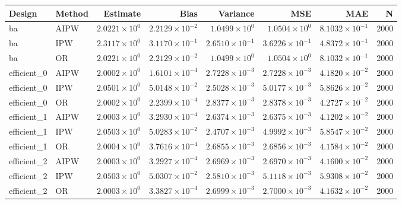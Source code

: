 \begin{table}[ht]
\centering
\begin{tabular}{llrrrrrr}
  \toprule
Design & Method & Estimate & Bias & Variance & MSE & MAE & N \\ 
  \midrule
ba & AIPW & $2.0221 \times 10^{0}$ & $2.2129 \times 10^{-2}$ & $1.0499 \times 10^{0}$ & $1.0504 \times 10^{0}$ & $8.1032 \times 10^{-1}$ & 2000 \\ 
  ba & IPW & $2.3117 \times 10^{0}$ & $3.1170 \times 10^{-1}$ & $2.6510 \times 10^{-1}$ & $3.6226 \times 10^{-1}$ & $4.8372 \times 10^{-1}$ & 2000 \\ 
  ba & OR & $2.0221 \times 10^{0}$ & $2.2129 \times 10^{-2}$ & $1.0499 \times 10^{0}$ & $1.0504 \times 10^{0}$ & $8.1032 \times 10^{-1}$ & 2000 \\ 
   \midrule
efficient\_0 & AIPW & $2.0002 \times 10^{0}$ & $1.6101 \times 10^{-4}$ & $2.7228 \times 10^{-3}$ & $2.7228 \times 10^{-3}$ & $4.1820 \times 10^{-2}$ & 2000 \\ 
  efficient\_0 & IPW & $2.0501 \times 10^{0}$ & $5.0148 \times 10^{-2}$ & $2.5028 \times 10^{-3}$ & $5.0177 \times 10^{-3}$ & $5.8626 \times 10^{-2}$ & 2000 \\ 
  efficient\_0 & OR & $2.0002 \times 10^{0}$ & $2.2399 \times 10^{-4}$ & $2.8377 \times 10^{-3}$ & $2.8378 \times 10^{-3}$ & $4.2727 \times 10^{-2}$ & 2000 \\ 
   \midrule
efficient\_1 & AIPW & $2.0003 \times 10^{0}$ & $3.2930 \times 10^{-4}$ & $2.6374 \times 10^{-3}$ & $2.6375 \times 10^{-3}$ & $4.1202 \times 10^{-2}$ & 2000 \\ 
  efficient\_1 & IPW & $2.0503 \times 10^{0}$ & $5.0283 \times 10^{-2}$ & $2.4707 \times 10^{-3}$ & $4.9992 \times 10^{-3}$ & $5.8547 \times 10^{-2}$ & 2000 \\ 
  efficient\_1 & OR & $2.0004 \times 10^{0}$ & $3.7616 \times 10^{-4}$ & $2.6855 \times 10^{-3}$ & $2.6856 \times 10^{-3}$ & $4.1584 \times 10^{-2}$ & 2000 \\ 
   \midrule
efficient\_2 & AIPW & $2.0003 \times 10^{0}$ & $3.2927 \times 10^{-4}$ & $2.6969 \times 10^{-3}$ & $2.6970 \times 10^{-3}$ & $4.1600 \times 10^{-2}$ & 2000 \\ 
  efficient\_2 & IPW & $2.0503 \times 10^{0}$ & $5.0307 \times 10^{-2}$ & $2.5810 \times 10^{-3}$ & $5.1118 \times 10^{-3}$ & $5.9308 \times 10^{-2}$ & 2000 \\ 
  efficient\_2 & OR & $2.0003 \times 10^{0}$ & $3.3827 \times 10^{-4}$ & $2.6999 \times 10^{-3}$ & $2.7000 \times 10^{-3}$ & $4.1632 \times 10^{-2}$ & 2000 \\ 

\end{tabular}
\end{table}
